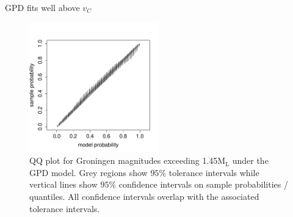 \begin{frame}{GPD fits well above $v_C$}
\begin{figure}
    \centering
    \includegraphics[width = 0.5\textwidth, page = 2]{groningen_application/motiving_GPD_over_exponential/groningen_conservative_mod_PP_QQ.pdf}
    \caption{QQ plot for Groningen magnitudes exceeding 1.45$\text{M}_{\text{L}}$ under the GPD model. Grey regions show $95\%$ tolerance intervals while vertical lines show $95\%$ confidence intervals on sample probabilities / quantiles. All confidence intervals overlap with the associated tolerance intervals.  }
\end{figure}
\end{frame}



